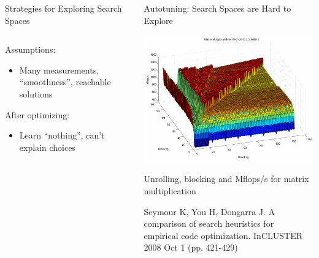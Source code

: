 \documentclass[11pt, compress, aspectratio=169, xcolor={table,usenames,dvipsnames}]{beamer}
\begin{document}
\begin{frame}
\begin{columns}
\begin{column}{0.86\columnwidth}
\begin{columns}
\begin{column}[t]{0.5\columnwidth}
\begin{block}{Strategies for Exploring Search Spaces}
\begin{columns}
\begin{column}{0.39\columnwidth}
Assumptions:
\vspace{0.3em}
\begin{itemize}
\item \alert{Many measurements}, \alert{``smoothness''}, \alert{reachable solutions}
\end{itemize}
\vspace{0.3em}
After optimizing:
\vspace{0.3em}
\begin{itemize}
\item \alert{Learn ``nothing''}, \alert{can't explain choices}
\end{itemize}
\end{column}
\end{columns}
\end{block}
\end{column}
\begin{column}[t]{0.5\columnwidth}
\begin{block}{Autotuning: Search Spaces are Hard to Explore}
\begin{center}
\includegraphics[width=.7\columnwidth]{../../../img/seymour2008comparison.pdf}
\end{center}

\begin{center}
{\footnotesize
\alert{Unrolling}, \alert{blocking} and \alert{Mflops/s} for \alert{matrix multiplication}
}

\tiny{Seymour K, You H, Dongarra J. A comparison of search heuristics for \\ empirical code optimization. InCLUSTER 2008 Oct 1 (pp. 421-429)}
\vspace{1.3em}
\end{center}


\end{block}
\end{column}
\end{columns}
\end{column}
\end{columns}
\end{frame}
\end{document}
